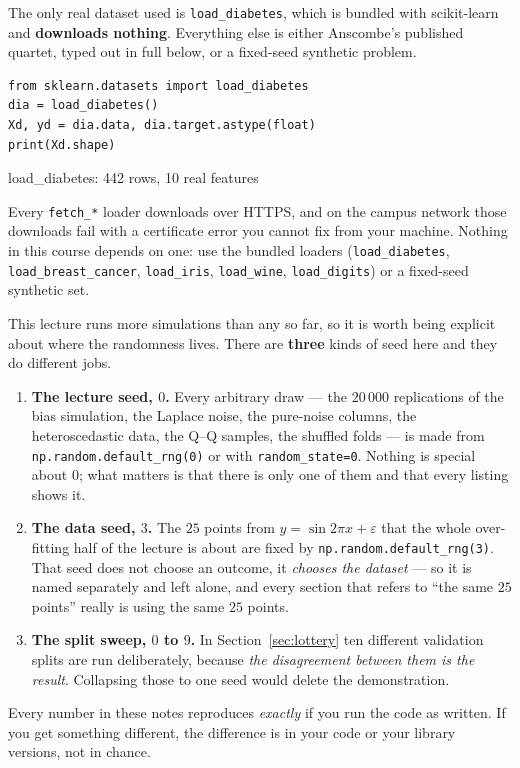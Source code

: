 \documentclass[11pt]{article}
\begin{document}
The only real dataset used is \texttt{load\_diabetes}, which is bundled with
scikit-learn and \textbf{downloads nothing}. Everything else is either
Anscombe's published quartet, typed out in full below, or a fixed-seed
synthetic problem.

\begin{lstlisting}
from sklearn.datasets import load_diabetes
dia = load_diabetes()
Xd, yd = dia.data, dia.target.astype(float)
print(Xd.shape)
\end{lstlisting}
\begin{codeout}
load_diabetes: 442 rows, 10 real features
\end{codeout}

\begin{caution}
Every \texttt{fetch\_*} loader downloads over HTTPS, and on the campus network
those downloads fail with a certificate error you cannot fix from your machine.
Nothing in this course depends on one: use the bundled loaders
(\texttt{load\_diabetes}, \texttt{load\_breast\_cancer}, \texttt{load\_iris},
\texttt{load\_wine}, \texttt{load\_digits}) or a fixed-seed synthetic set.
\end{caution}

\begin{keyidea}
This lecture runs more simulations than any so far, so it is worth being
explicit about where the randomness lives. There are \textbf{three} kinds of
seed here and they do different jobs.

\begin{enumerate}[leftmargin=*]
  \item \textbf{The lecture seed, $0$.} Every arbitrary draw --- the
    $20\,000$ replications of the bias simulation, the Laplace noise, the
    pure-noise columns, the heteroscedastic data, the Q--Q samples, the
    shuffled folds --- is made from \texttt{np.random.default\_rng(0)} or with
    \texttt{random\_state=0}. Nothing is special about $0$; what matters is
    that there is only one of them and that every listing shows it.
  \item \textbf{The data seed, $3$.} The $25$ points from
    $y = \sin 2\pi x + \varepsilon$ that the whole over-fitting half of the
    lecture is about are fixed by \texttt{np.random.default\_rng(3)}. That
    seed does not choose an outcome, it \emph{chooses the dataset} --- so it is
    named separately and left alone, and every section that refers to ``the
    same $25$ points'' really is using the same $25$ points.
  \item \textbf{The split sweep, $0$ to $9$.} In
    Section~\ref{sec:lottery} ten different validation splits are run
    deliberately, because \emph{the disagreement between them is the result}.
    Collapsing those to one seed would delete the demonstration.
\end{enumerate}

Every number in these notes reproduces \emph{exactly} if you run the code as
written. If you get something different, the difference is in your code or
your library versions, not in chance.
\end{keyidea}
\end{document}
